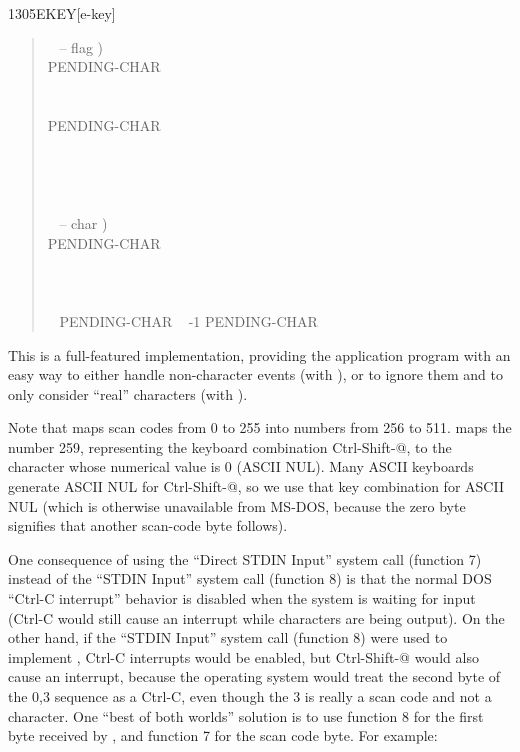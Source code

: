 \begin{newword}{1305}{EKEY}[e-key]
\begin{rationale}
\begin{quote}
\begin{tabbing}
			\+ \word{:} ~  -- flag ) \\
				\+ PENDING-CHAR    \\
					\+ ~   \\
						\+    \\
						\-	PENDING-CHAR \word{!}~   \\
					\-   \\
				\- ~   \\
			\- ~  \\
			\word{;} \\[\parskip]

			\+ \word{:} ~  -- char ) \\
				\+ PENDING-CHAR    \\
					~ ~    \\
					\>  \\
				\-	~  \\
			\- ~ PENDING-CHAR ~ -1 PENDING-CHAR \word{!} \\
			\word{;}
			\end{tabbing}
		\end{quote}

		This is a full-featured implementation, providing the
		application program with an easy way to either handle
		non-character events (with ), or to ignore them
		and to only consider ``real'' characters (with
		).

		Note that  maps scan codes from 0 to 255 into
		numbers from 256 to 511.  maps the number 259,
		representing the keyboard combination Ctrl-Shift-@, to the
		character whose numerical value is 0 (ASCII NUL). Many ASCII
		keyboards generate ASCII NUL for Ctrl-Shift-@, so we use that
		key combination for ASCII NUL (which is otherwise unavailable
		from MS-DOS, because the zero byte signifies that another
		scan-code byte follows).

		One consequence of using the ``Direct STDIN Input'' system call
		(function 7) instead of the ``STDIN Input'' system call
		(function 8) is that the normal DOS ``Ctrl-C interrupt'' behavior
		is disabled when the system is waiting for input (Ctrl-C would
		still cause an interrupt while characters are being output). On
		the other hand, if the ``STDIN Input'' system call (function 8)
		were used to implement , Ctrl-C interrupts would be
		enabled, but Ctrl-Shift-@ would also cause an interrupt, because
		the operating system would treat the second byte of the 0,3
		sequence as a Ctrl-C, even though the 3 is really a scan code
		and not a character. One ``best of both worlds'' solution is to
		use function 8 for the first byte received by , and
		function 7 for the scan code byte. For example:


\end{rationale}
\end{newword}
